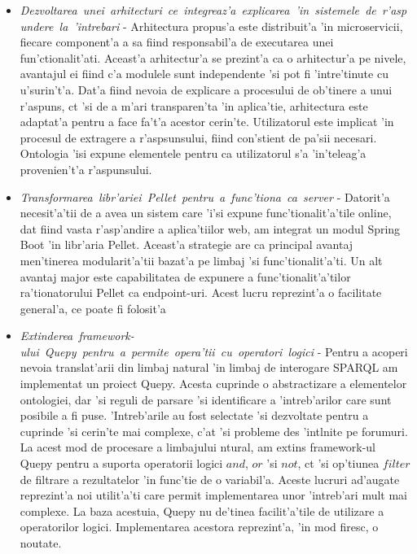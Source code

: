 \documentclass[12pt,a4paper,twoside]{report}
\begin{document}
\begin{itemize}
    \item {\it Dezvoltarea\ unei\ arhitecturi\ ce\ integreaz'a\ explicarea\  'in\ sistemele\ de\ r'aspundere\ la\ 'intrebari} -  Arhitectura propus'a este distribuit'a 'in microservicii, fiecare component'a a sa fiind responsabil'a de executarea unei fun'ctionalit'ati. Aceast'a arhitectur'a se prezint'a ca o arhitectur'a pe nivele, avantajul ei fiind c'a modulele sunt independente 'si pot fi 'intre'tinute cu u'surin't'a. Dat'a fiind nevoia de explicare a procesului de ob'tinere a unui r'aspuns, c\ia t 'si de a m'ari transparen'ta 'in aplica'tie, arhitectura este adaptat'a pentru a face fa't'a acestor cerin'te. Utilizatorul este implicat 'in procesul de extragere a r'aspsunsului, fiind con'stient de pa'sii necesari. Ontologia 'isi expune elementele pentru ca utilizatorul s'a 'in'teleag'a provenien't'a r'aspunsului.

    
    \item {\it Transformarea\ libr'ariei\ Pellet\ pentru\ a\ func'tiona\ ca\ server} - Datorit'a necesit'a'tii de a avea un sistem care 'i'si expune func'tionalit'a'tile online, dat fiind vasta r'asp'andire a aplica'tiilor web, am integrat un modul Spring Boot 'in libr'aria Pellet. Aceast'a strategie are ca principal avantaj men'tinerea modularit'a'tii bazat'a pe limbaj 'si func'tionalit'a'ti. Un alt avantaj major este capabilitatea de expunere a func'tionalit'a'tilor ra'tionatorului Pellet ca endpoint-uri. Acest lucru reprezint'a o facilitate general'a, ce poate fi folosit'a  
  
    \item {\it Extinderea\ framework-ului\ Quepy\ pentru\ a\ permite\ opera'tii\ cu\ operatori\ logici} - Pentru a acoperi nevoia translat'arii din limbaj natural 'in limbaj de interogare SPARQL am implementat un proiect Quepy. Acesta cuprinde o abstractizare a elementelor ontologiei, dar 'si reguli de parsare 'si identificare a 'intreb'arilor care sunt posibile a fi puse. 'Intreb'arile au fost selectate 'si dezvoltate pentru a cuprinde 'si cerin'te mai complexe, c'at 'si probleme des 'int\ia lnite pe forumuri. La acest mod de procesare a limbajului ntural, am extins framework-ul Quepy pentru a suporta operatorii logici $and$, $or$ 'si $not$, c\ia t 'si op'tiunea $filter$ de filtrare a rezultatelor 'in func'tie de o variabil'a. Aceste lucruri ad'augate reprezint'a noi utilit'a'ti care permit implementarea unor 'intreb'ari mult mai complexe. La baza acestuia, Quepy nu de'tinea facilit'a'tile de utilizare a operatorilor logici. Implementarea acestora reprezint'a, 'in mod firesc, o noutate.
    

\end{itemize}
\end{document}
